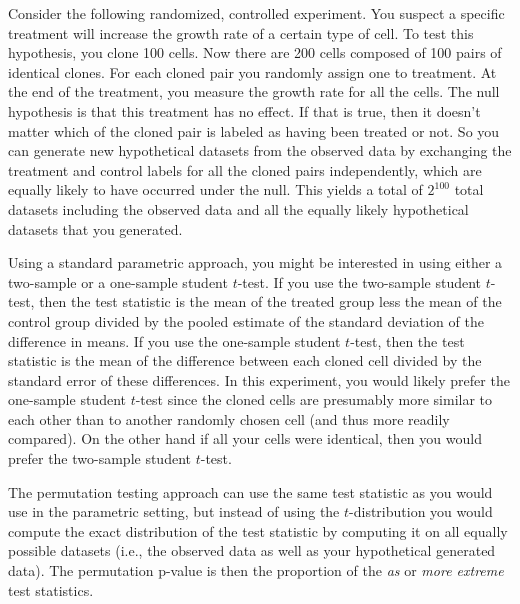 \begin{example}[label=exa:cont] Consider the following randomized, controlled
experiment.  You suspect a specific treatment will increase the growth
rate of a certain type of cell.  To test this hypothesis, you clone 100 cells.
Now there are 200 cells composed of 100 pairs of identical clones.  For each
cloned pair you randomly assign one to treatment.  At the end of the treatment,
you measure the growth rate for all the cells.  The null hypothesis is that
this treatment has no effect. If that is true, then it doesn't matter which of
the cloned pair is labeled as having been treated or not.  So you can generate
new hypothetical datasets from the observed data by exchanging the treatment
and control labels for all the cloned pairs independently, which are equally
likely to have occurred under the null.  This yields a total of $2^{100}$ total
datasets including the observed data and all the equally likely hypothetical
datasets that you generated.

Using a standard parametric approach, you might be interested in using either a
two-sample or a one-sample student $t$-test.  If you use the two-sample student
$t$-test, then the test statistic is the mean of the treated group less the
mean of the control group divided by the pooled estimate of the standard
deviation of the difference in means.  If you use the one-sample student
$t$-test, then the test statistic is the mean of the difference between each
cloned cell divided by the standard error of these differences.  In this
experiment, you would likely prefer the one-sample student $t$-test since the
cloned cells are presumably more similar to each other than to another
randomly chosen cell (and thus more readily compared).  On the other hand if
all your cells were identical, then you would prefer the two-sample
student $t$-test.

The permutation testing approach can use the same test statistic as you would
use in the parametric setting, but instead of using the $t$-distribution you
would compute the exact distribution of the test statistic by computing it
on all equally possible datasets (i.e., the observed data as well as your
hypothetical generated data).  The permutation p-value is then the proportion
of the \emph{as} or \emph{more extreme} test statistics.
\end{example}

